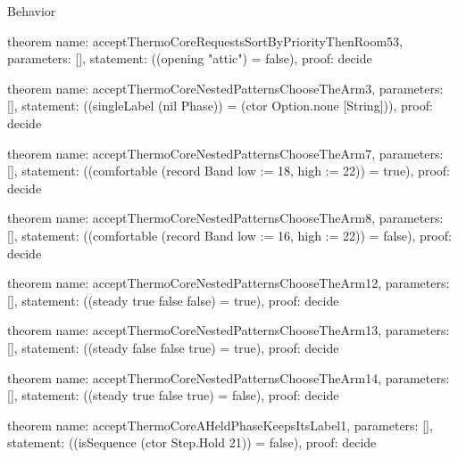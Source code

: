 \begin{lexlean}{Behavior}
\begin{semanticmodule}
theorem{
  name: acceptThermoCoreRequestsSortByPriorityThenRoom53,
  parameters: [],
  statement: ((opening "attic") = false),
  proof: decide{}
}

theorem{
  name: acceptThermoCoreNestedPatternsChooseTheArm3,
  parameters: [],
  statement: ((singleLabel (nil Phase)) = (ctor Option.none [String])),
  proof: decide{}
}

theorem{
  name: acceptThermoCoreNestedPatternsChooseTheArm7,
  parameters: [],
  statement: ((comfortable (record Band {low := 18, high := 22})) = true),
  proof: decide{}
}

theorem{
  name: acceptThermoCoreNestedPatternsChooseTheArm8,
  parameters: [],
  statement: ((comfortable (record Band {low := 16, high := 22})) = false),
  proof: decide{}
}

theorem{
  name: acceptThermoCoreNestedPatternsChooseTheArm12,
  parameters: [],
  statement: ((steady true false false) = true),
  proof: decide{}
}

theorem{
  name: acceptThermoCoreNestedPatternsChooseTheArm13,
  parameters: [],
  statement: ((steady false false true) = true),
  proof: decide{}
}

theorem{
  name: acceptThermoCoreNestedPatternsChooseTheArm14,
  parameters: [],
  statement: ((steady true false true) = false),
  proof: decide{}
}

theorem{
  name: acceptThermoCoreAHeldPhaseKeepsItsLabel1,
  parameters: [],
  statement: ((isSequence (ctor Step.Hold 21)) = false),
  proof: decide{}
}
\end{semanticmodule}
\end{lexlean}
